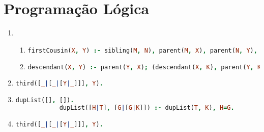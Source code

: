 \documentclass{article}
\begin{document}
\newpage

\section{Programação Lógica}

\begin{enumerate}
    \item
        \begin{enumerate}[label=(\alph*)]

            \item
                \begin{lstlisting}[language=Prolog]
                    firstCousin(X, Y) :- sibling(M, N), parent(M, X), parent(N, Y), not(X=Y), not(sibling(X, Y)).
                \end{lstlisting}

            \item
                \begin{lstlisting}[language=Prolog]
                    descendant(X, Y) :- parent(Y, X); (descendant(X, K), parent(Y, K)).
                \end{lstlisting}
        \end{enumerate}

    \item
        \begin{lstlisting}[language=Prolog]
            third([_|[_|[Y|_]]], Y).
        \end{lstlisting}

    \item
        \begin{lstlisting}[language=Prolog]
            dupList([], []).
            dupList([H|T], [G|[G|K]]) :- dupList(T, K), H=G.
        \end{lstlisting}

    \item

        \begin{lstlisting}[language=Prolog]
            third([_|[_|[Y|_]]], Y).
        \end{lstlisting}
\end{enumerate}
    
\end{document}

